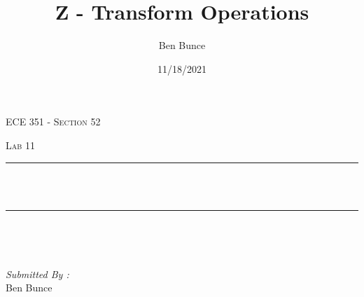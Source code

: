 \documentclass[12pt]{report}
\title{Z - Transform Operations}
\author{Ben Bunce}
\date{11/18/2021}
\makeatletter
\let\thetitle\@title
\makeatother
\begin{document}

\begin{titlepage}
	\centering
    \vspace*{0.5 cm}
\begin{center}    \textsc{\Large   ECE 351 - Section 52}\\[2.0 cm]	\end{center}%
	\textsc{\Large Lab 11  }\\[0.5 cm]				%
	\rule{\linewidth}{0.2 mm} \\[0.4 cm]
	{ \huge \bfseries \thetitle}\\
	\rule{\linewidth}{0.2 mm} \\[1.5 cm]
	
	\begin{minipage}{0.4\textwidth}
		\begin{flushleft} \large
			\end{flushleft}
			\end{minipage}~
			\begin{minipage}{0.4\textwidth}
            
			\begin{flushright} \large
			\emph{Submitted By :} \\
			Ben Bunce  
		\end{flushright}
           
	\end{minipage}\\[2 cm]
	
    
    
    
    
	
\end{titlepage}


\tableofcontents
\pagebreak

\renewcommand{\thesection}{\arabic{section}}
\end{document}
